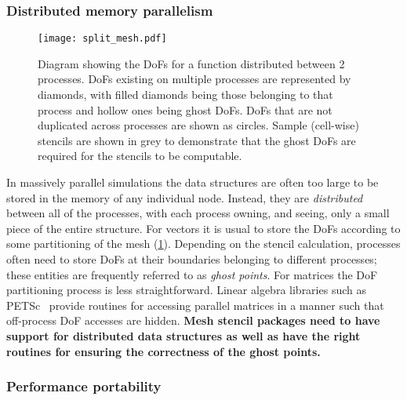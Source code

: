 \documentclass[thesis]{subfiles}
\begin{document}

\subsubsection{Distributed memory parallelism}
\label{sec:intro_parallelism}

\begin{figure}
  \centering
  \texttt{[image: split\_mesh.pdf]}
  \caption{
    Diagram showing the DoFs for a function distributed between 2 processes.
    DoFs existing on multiple processes are represented by diamonds, with filled diamonds being those belonging to that process and hollow ones being ghost DoFs.
    DoFs that are not duplicated across processes are shown as circles.
    Sample (cell-wise) stencils are shown in grey to demonstrate that the ghost DoFs are required for the stencils to be computable.
  }
  \label{fig:pyop2_split_mesh}
\end{figure}

In massively parallel simulations the data structures are often too large to be stored in the memory of any individual node.
Instead, they are \textit{distributed} between all of the processes, with each process owning, and seeing, only a small piece of the entire structure.
For vectors it is usual to store the DoFs according to some partitioning of the mesh (\cref{fig:pyop2_split_mesh}).
Depending on the stencil calculation, processes often need to store DoFs at their boundaries belonging to different processes; these entities are frequently referred to as \textit{ghost points}.
For matrices the DoF partitioning process is less straightforward.
Linear algebra libraries such as PETSc~\cite{petsc-user-ref,petsc-web-page,petsc-efficient} provide routines for accessing parallel matrices in a manner such that off-process DoF accesses are hidden.
\textbf{Mesh stencil packages need to have support for distributed data structures as well as have the right routines for ensuring the correctness of the ghost points.}

\subsubsection{Performance portability}

\end{document}
